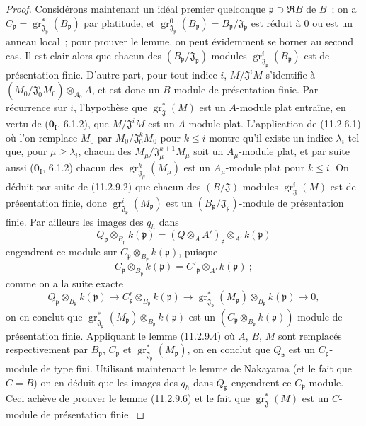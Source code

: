 \begin{proof}
Considérons maintenant un idéal premier quelconque
$\mathfrak p\supset\mathfrak RB$ de $B$~; on a
$C_\mathfrak p=\operatorname{gr}_{\mathfrak J_\mathfrak p}^*(B_\mathfrak p)$
par platitude, et
$\operatorname{gr}_{\mathfrak J_\mathfrak p}^0(B_\mathfrak p)
=B_\mathfrak p/\mathfrak J_\mathfrak p$ est réduit à 0 ou est un anneau
local~; pour prouver le lemme, on peut évidemment se borner au second cas. Il
est clair alors que chacun des $(B_\mathfrak p/\mathfrak J_\mathfrak p)$-modules
$\operatorname{gr}_{\mathfrak J_\mathfrak p}^i(B_\mathfrak p)$ est de
présentation finie. D'autre part, pour tout indice $i$,
$M/\mathfrak J^iM$ s'identifie à
$(M_0/\mathfrak J_0^iM_0)\otimes_{A_0}A$, et est donc un $B$-module de
présentation finie. Par récurrence sur $i$, l'hypothèse que
$\operatorname{gr}_{\mathfrak J}^*(M)$ est un $A$-module plat entraîne, en
vertu de ($\mathbf 0_{\mathrm I}$, 6.1.2), que $M/\mathfrak J^iM$ est un
$A$-module plat. L'application de (11.2.6.1) où l'on remplace $M_0$ par
$M_0/\mathfrak J_0^kM_0$ pour $k\leq i$ montre qu'il existe un indice
$\lambda_i$ tel que, pour $\mu\geq\lambda_i$, chacun des
$M_\mu/\mathfrak J_\mu^{k+1}M_\mu$ soit un $A_\mu$-module plat, et par suite
aussi ($\mathbf 0_{\mathrm I}$, 6.1.2) chacun des
$\operatorname{gr}_{\mathfrak J_\mu}^k(M_\mu)$ est un $A_\mu$-module plat
pour $k\leq i$. On déduit par suite de (11.2.9.2) que chacun des
$(B/\mathfrak J)$-modules $\operatorname{gr}_{\mathfrak J}^i(M)$ est de
présentation finie, donc
$\operatorname{gr}_{\mathfrak J_\mathfrak p}^i(M_\mathfrak p)$ est un
$(B_\mathfrak p/\mathfrak J_\mathfrak p)$-module de présentation finie. Par
ailleurs les images des $q_h$ dans
\[
Q_\mathfrak p\otimes_{B_\mathfrak p}k(\mathfrak p)
=(Q\otimes_AA')_\mathfrak p\otimes_{A'}k(\mathfrak p)
\]
engendrent ce module sur
$C_\mathfrak p\otimes_{B_\mathfrak p}k(\mathfrak p)$, puisque
\[
C_\mathfrak p\otimes_{B_\mathfrak p}k(\mathfrak p)
=C'_\mathfrak p\otimes_{A'}k(\mathfrak p)~;
\]
comme on a la suite exacte
\[
Q_\mathfrak p\otimes_{B_\mathfrak p}k(\mathfrak p)
\longrightarrow C_\mathfrak p^{r}\otimes_{B_\mathfrak p}k(\mathfrak p)
\longrightarrow
\operatorname{gr}_{\mathfrak J_\mathfrak p}^*(M_\mathfrak p)
\otimes_{B_\mathfrak p}k(\mathfrak p)\longrightarrow0,
\]
on en conclut que
$\operatorname{gr}_{\mathfrak J_\mathfrak p}^*(M_\mathfrak p)
\otimes_{B_\mathfrak p}k(\mathfrak p)$ est un
$(C_\mathfrak p\otimes_{B_\mathfrak p}k(\mathfrak p))$-module de présentation
finie. Appliquant le lemme (11.2.9.4) où $A$, $B$, $M$ sont remplacés
respectivement par $B_\mathfrak p$, $C_\mathfrak p$ et
$\operatorname{gr}_{\mathfrak J_\mathfrak p}^*(M_\mathfrak p)$, on en conclut
que $Q_\mathfrak p$ est un $C_\mathfrak p$-module de type fini. Utilisant
maintenant le lemme de Nakayama (et le fait que $C=B$) on en déduit que les
images des $q_h$ dans $Q_\mathfrak p$ engendrent ce $C_\mathfrak p$-module.
Ceci achève de prouver le lemme (11.2.9.6) et le fait que
$\operatorname{gr}_{\mathfrak J}^*(M)$ est un $C$-module de présentation
finie.


\end{proof}
